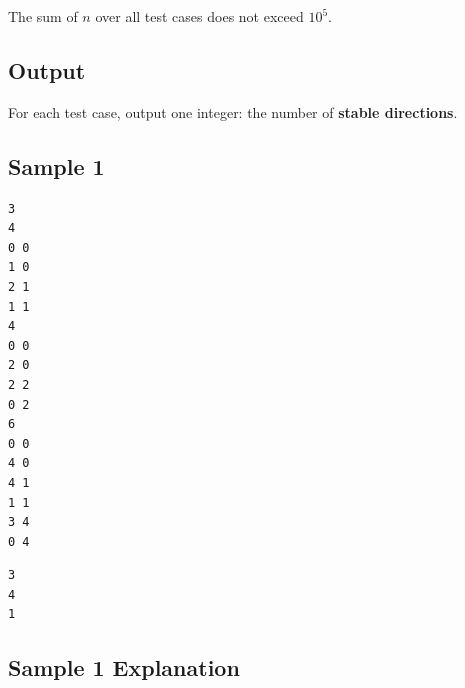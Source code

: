 The sum of $n$ over all test cases does not exceed $10^5$.

\subsection{Output}

For each test case, output one integer: the number of \textbf{stable directions}.

\subsection{Sample 1}

\begin{minipage}{\linewidth}
	\begin{minipage}[t]{0.49\linewidth}
		\begin{lstlisting}[title=\texttt{standard input}]
3
4
0 0
1 0
2 1
1 1
4
0 0
2 0
2 2
0 2
6
0 0
4 0
4 1
1 1
3 4
0 4

\end{lstlisting}
	\end{minipage}
	\begin{minipage}[t]{0.49\linewidth}
		\begin{lstlisting}[title=\texttt{standard output}]
3
4
1
\end{lstlisting}
	\end{minipage}
\end{minipage}

\newpage
\subsection{Sample 1 Explanation}


